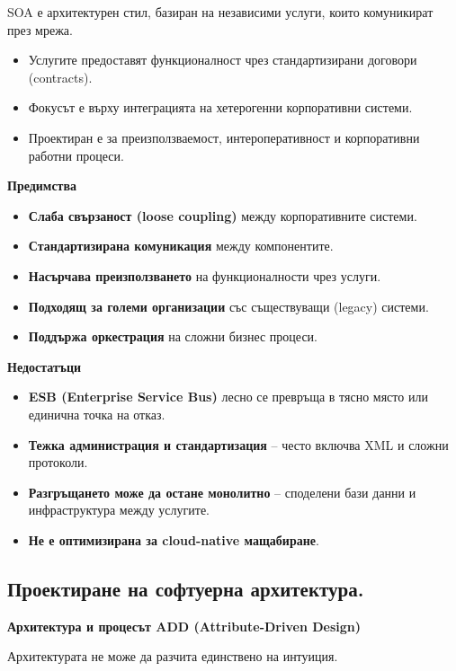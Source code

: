 \documentclass{article}
\renewcommand{\\}{\newline}
\begin{document}
SOA е архитектурен стил, базиран на независими услуги, които комуникират през мрежа.

\begin{itemize}
    \item Услугите предоставят функционалност чрез стандартизирани договори (contracts).
    \item Фокусът е върху интеграцията на хетерогенни корпоративни системи.
    \item Проектиран е за преизползваемост, интероперативност и корпоративни работни процеси.
\end{itemize}

\textbf{Предимства}

\begin{itemize}
    \item \textbf{Слаба свързаност (loose coupling)} между корпоративните системи.
    \item \textbf{Стандартизирана комуникация} между компонентите.
    \item \textbf{Насърчава преизползването} на функционалности чрез услуги.
    \item \textbf{Подходящ за големи организации} със съществуващи (legacy) системи.
    \item \textbf{Поддържа оркестрация} на сложни бизнес процеси.
\end{itemize}

\textbf{Недостатъци}

\begin{itemize}
    \item \textbf{ESB (Enterprise Service Bus)} лесно се превръща в тясно място или единична точка на отказ.
    \item \textbf{Тежка администрация и стандартизация} – често включва XML и сложни протоколи.
    \item \textbf{Разгръщането може да остане монолитно} – споделени бази данни и инфраструктура между услугите.
    \item \textbf{Не е оптимизирана за cloud-native мащабиране}.
\end{itemize}

\subsection{Проектиране на софтуерна архитектура.} 

\textbf{Архитектура и процесът ADD (Attribute-Driven Design)}

Архитектурата не може да разчита единствено на интуиция.
\end{document}

